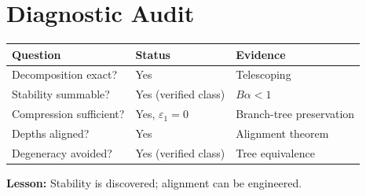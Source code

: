 \section{Diagnostic Audit}

\begin{center}\small
\begin{tabular}{lll}
\toprule
Question & Status & Evidence \\
\midrule
Decomposition exact? & Yes & Telescoping \\
Stability summable? & Yes (verified class) & $B\alpha < 1$ \\
Compression sufficient? & Yes, $\varepsilon_1 = 0$ & Branch-tree preservation \\
Depths aligned? & Yes & Alignment theorem \\
Degeneracy avoided? & Yes (verified class) & Tree equivalence \\
\bottomrule
\end{tabular}
\end{center}

\textbf{Lesson:} Stability is discovered; alignment can be engineered.
